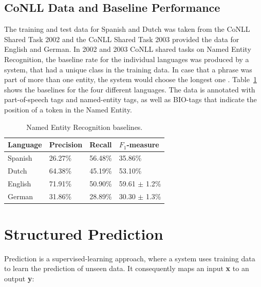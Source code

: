 \documentclass[11pt]{article}
\begin{document}
\subsection{CoNLL Data and Baseline Performance}
The training and test data for Spanish and Dutch was taken from the CoNLL Shared Task 2002 \cite{tksintro} and 
the CoNLL Shared Task 2003 \cite{TjongKimSang:2003:ICS:1119176.1119195} provided the data for English and German.
In 2002 and 2003 CoNLL shared tasks on Named Entity Recognition, the baseline rate for the individual languages was produced by a system, that had a unique class in the training data. 
In case that a phrase was part of more than one entity, the system would choose the longest one \cite{TjongKimSang:2003:ICS:1119176.1119195}.
Table~\ref{table:Base} shows the baselines for the four different languages.  
The data is annotated with part-of-speech tags and named-entity tags, as well as BIO-tags that indicate the position of a token in the Named Entity. %


\begin{table}[h!]
\small
\begin{tabular}{|l|l|l|l|}
\hline
\bf Language & \bf Precision & \bf Recall & \bf $F_1$-measure \\ \hline
Spanish &             26.27\% & 56.48\% & 35.86\%        \\
Dutch  &             64.38\%  &45.19\%    & 53.10\%  \\
English &              71.91\%& 50.90\%  & 59.61 $\pm$ 1.2\%\\
German &      31.86\%  & 28.89\% & 30.30  $\pm$ 1.3\% \\
\hline
\end{tabular}
\caption{Named Entity Recognition baselines.}
\label{table:Base}
\end{table}

\section{Structured Prediction}
Prediction \cite{Taskar:2005:LSP:1102351.1102464} is a supervised-learning approach, where a system uses training data to learn the prediction
of unseen data. It consequently maps an input \textbf{x} to an output \textbf{y}: \\
\end{document}
